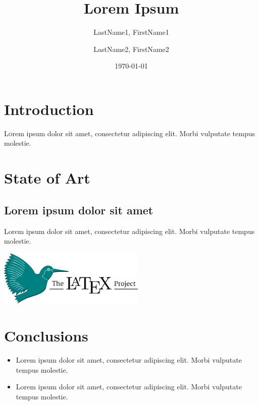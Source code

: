 \documentclass[twoside,twocolumn]{article}
\title{Lorem Ipsum}
\author{
	LastName1, FirstName1\\
	\and
	LastName2, FirstName2\\
}
\date{\today}
\begin{document}
\maketitle


\section{Introduction}

\lettrine[nindent=0em,lines=3]{L}orem ipsum dolor sit amet, consectetur adipiscing elit.
Morbi vulputate tempus molestie\cite{texbook}.


\section{State of Art}

\subsection{Lorem ipsum dolor sit amet}

Lorem ipsum dolor sit amet, consectetur adipiscing elit. Morbi vulputate tempus molestie\cite{latex:companion}.

\begin{center}
	\includegraphics[width=7cm]{./images/latex-logo} 
\end{center}
	

\section{Conclusions}
\begin{itemize}	
	
	\item Lorem ipsum dolor sit amet, consectetur adipiscing elit. Morbi vulputate tempus molestie.
	\item Lorem ipsum dolor sit amet, consectetur adipiscing elit. Morbi vulputate tempus molestie.

\end{itemize}


 
 
\end{document}
